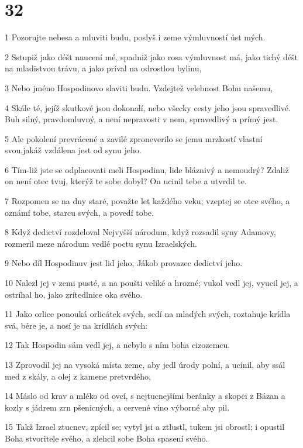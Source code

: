 \chapter{32}

\par 1 Pozorujte nebesa a mluviti budu, poslyš i zeme výmluvností úst mých.
\par 2 Sstupiž jako déšt naucení mé, spadniž jako rosa výmluvnost má, jako tichý déšt na mladistvou trávu, a jako príval na odrostlou bylinu,
\par 3 Nebo jméno Hospodinovo slaviti budu. Vzdejtež velebnost Bohu našemu,
\par 4 Skále té, jejíž skutkové jsou dokonalí, nebo všecky cesty jeho jsou spravedlivé. Buh silný, pravdomluvný, a není nepravosti v nem, spravedlivý a prímý jest.
\par 5 Ale pokolení prevrácené a zavilé zproneverilo se jemu mrzkostí vlastní svou,jakáž vzdálena jest od synu jeho.
\par 6 Tím-liž jste se odplacovati meli Hospodinu, lide bláznivý a nemoudrý? Zdaliž on není otec tvuj, kterýž te sobe dobyl? On ucinil tebe a utvrdil te.
\par 7 Rozpomen se na dny staré, považte let každého veku; vzeptej se otce svého, a oznámí tobe, starcu svých, a povedí tobe.
\par 8 Když dedictví rozdeloval Nejvyšší národum, když rozsadil syny Adamovy, rozmeril meze národum vedlé poctu synu Izraelských.
\par 9 Nebo díl Hospodinuv jest lid jeho, Jákob provazec dedictví jeho.
\par 10 Nalezl jej v zemi pusté, a na poušti veliké a hrozné; vukol vedl jej, vyucil jej, a ostríhal ho, jako zrítedlnice oka svého.
\par 11 Jako orlice ponouká orlicátek svých, sedí na mladých svých, roztahuje krídla svá, bére je, a nosí je na krídlách svých:
\par 12 Tak Hospodin sám vedl jej, a nebylo s ním boha cizozemcu.
\par 13 Zprovodil jej na vysoká místa zeme, aby jedl úrody polní, a ucinil, aby ssál med z skály, a olej z kamene pretvrdého,
\par 14 Máslo od krav a mléko od ovcí, s nejtucnejšími beránky a skopci z Bázan a kozly s jádrem zrn pšenicných, a cervené víno výborné aby pil.
\par 15 Takž Izrael ztucnev, zpícil se; vytyl jsi a ztlustl, tukem jsi obrostl; i opustil Boha stvoritele svého, a zlehcil sobe Boha spasení svého.
